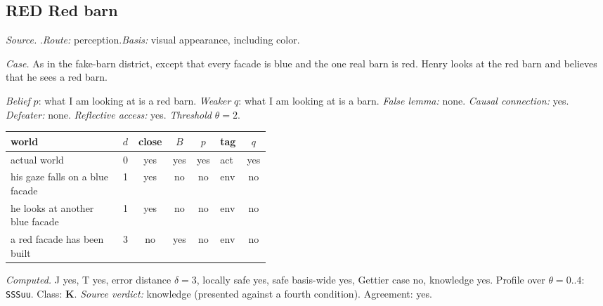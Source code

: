 \subsection*{RED \enspace Red barn}
\noindent\textit{Source.} \citet{Kripke2011}.\quad \textit{Route:} perception.\quad \textit{Basis:} visual appearance, including color.\par
\noindent\textit{Case.} As in the fake-barn district, except that every facade is blue and the one real barn is red. Henry looks at the red barn and believes that he sees a red barn.\par
\noindent\textit{Belief} $p$: what I am looking at is a red barn.
 \textit{Weaker} $q$: what I am looking at is a barn.
 \textit{False lemma:} none. \textit{Causal connection:} yes. \textit{Defeater:} none. \textit{Reflective access:} yes. \textit{Threshold} $\theta = 2$.\par
\begin{center}\begin{tabular}{@{}p{0.43\linewidth}rccclc@{}}
world & $d$ & close & $B$ & $p$ & tag & $q$ \\ \midrule
actual world & 0 & yes & yes & yes & act & yes \\
his gaze falls on a blue facade & 1 & yes & no & no & env & no \\
he looks at another blue facade & 1 & yes & no & no & env & no \\
a red facade has been built & 3 & no & yes & no & env & no \\
\end{tabular}\end{center}
\noindent\textit{Computed.} J yes, T yes, error distance $\delta = 3$, locally safe yes, safe basis-wide yes, Gettier case no, knowledge yes. Profile over $\theta = 0..4$: \texttt{SSSuu}. Class: \textbf{K}.
 \textit{Source verdict:} knowledge (presented against a fourth condition). Agreement: yes.
\par\medskip
{}
